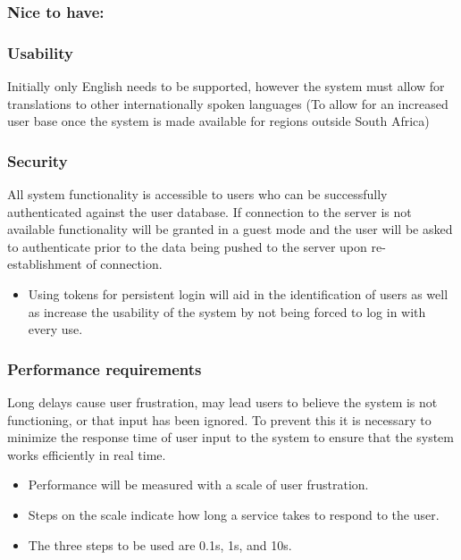 \documentclass[hidelinks,a4paper,12pt]{article}
\begin{document}
	\subsubsection{Nice to have:}
	
	\subsubsection*{Usability}
	Initially only English needs to be supported, however the system must allow for translations to other internationally spoken languages (To allow for an increased user base once the system is made available for regions outside South Africa)	
	
	\subsubsection*{Security}
	All system functionality is accessible to users who can be successfully authenticated against the user database. If connection to the server is not available functionality will be granted in a guest mode and the user will be asked to authenticate prior to the data being pushed to the server upon re-establishment of connection.
	\begin{itemize}
		\item Using tokens for persistent login will aid in the identification of users as well as increase the usability of the system by not being forced to log in with every use.
	\end{itemize}
	
	\subsubsection*{Performance requirements}	
	Long delays cause user frustration, may lead users to believe the system is not functioning, or that input has been ignored. To prevent this it is necessary to minimize the response time of user input to the system to ensure that the system works efficiently in real time.
	\begin{itemize}
		\item Performance will be measured with a scale of user frustration.
		\item Steps on the scale indicate how long a service takes to respond to the user.
		\item The three steps to be used are 0.1s, 1s, and 10s.
	\end{itemize}				
\end{document}

